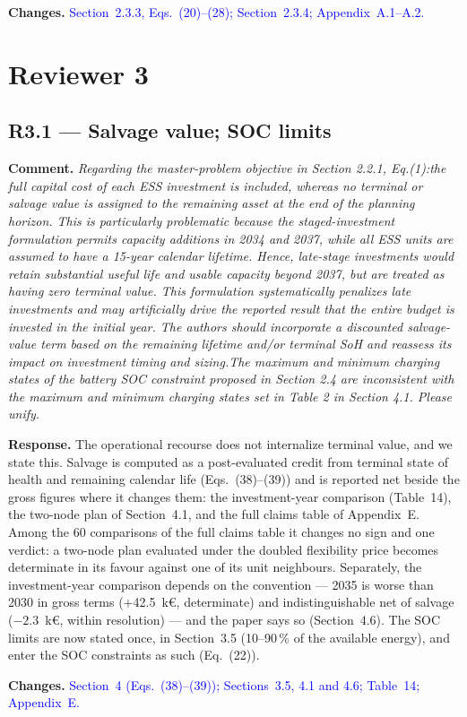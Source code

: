 \documentclass[11pt]{article}
\newcommand{\rcomment}[1]{\par\medskip\noindent\textbf{Comment.} \textit{#1}\par\smallskip}
\newcommand{\rresponse}[1]{\noindent\textbf{Response.} #1\par\smallskip}
\newcommand{\rchanges}[1]{\noindent\textbf{Changes.} \textcolor{blue}{#1}\par\medskip}
\begin{document}
\rchanges{
    Section~2.3.3, Eqs.~(20)--(28); Section~2.3.4; Appendix~A.1--A.2.
}

\section*{Reviewer 3}

\subsection*{R3.1 --- Salvage value; SOC limits}
\rcomment{
Regarding the master-problem objective in Section 2.2.1, Eq.(1):the full capital cost of each ESS investment is included, whereas no terminal or salvage value is assigned to the remaining asset at the end of the planning horizon. This is particularly problematic because the staged-investment formulation permits capacity additions in 2034 and 2037, while all ESS units are assumed to have a 15-year calendar lifetime. Hence, late-stage investments would retain substantial useful life and usable capacity beyond 2037, but are treated as having zero terminal value. This formulation systematically penalizes late investments and may artificially drive the reported result that the entire budget is invested in the initial year. The authors should incorporate a discounted salvage-value term based on the remaining lifetime and/or terminal SoH and reassess its impact on investment timing and sizing.The maximum and minimum charging states of the battery SOC constraint proposed in Section 2.4 are inconsistent with the maximum and minimum charging states set in Table 2 in Section 4.1. Please unify.
}
\rresponse{The operational recourse does not internalize terminal value, and we state this. Salvage is computed as a post-evaluated credit from terminal state of health and remaining calendar life (Eqs.~(38)--(39)) and is reported net beside the gross figures where it changes them: the investment-year comparison (Table~14), the two-node plan of Section~4.1, and the full claims table of Appendix~E. 
Among the 60 comparisons of the full claims table it changes no sign and one verdict: a two-node plan evaluated under the doubled flexibility price becomes determinate in its favour against one of its unit neighbours. Separately, the investment-year comparison depends on the convention --- 2035 is worse than 2030 in gross terms (+42.5~k\euro{}, determinate) and indistinguishable net of salvage ($-2.3$~k\euro{}, within resolution) --- and the paper says so (Section~4.6). The SOC limits are now stated once, in Section~3.5 (10--90\,\% of the available energy), and enter the SOC constraints as such (Eq.~(22)).}
\rchanges{Section~4 (Eqs.~(38)--(39)); Sections~3.5, 4.1 and 4.6; Table~14; Appendix~E.}
\end{document}
